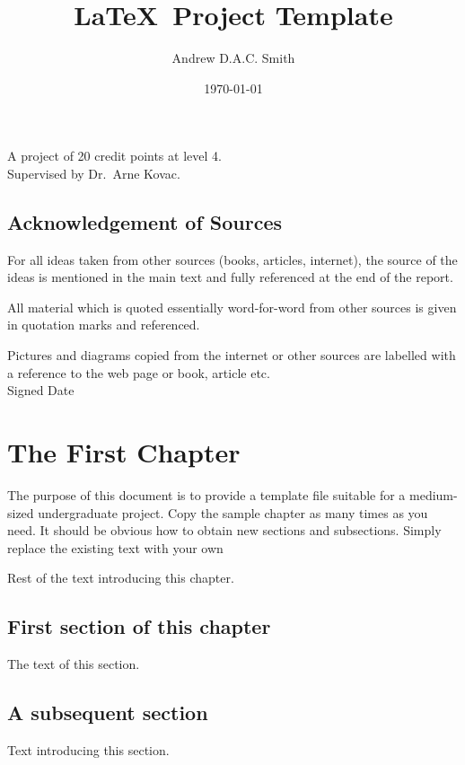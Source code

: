 \documentclass[a4paper, 12pt, notitlepage]{report}
\title{\LaTeX\ Project Template} %
\author{Andrew D.A.C. Smith} %
\date{\today} %
\begin{document}
\maketitle
\begin{center}
A project of 20 credit points at level 4. %
\\[12pt]
Supervised by Dr.\ Arne Kovac. %
\end{center}
\thispagestyle{empty}
\newpage
\section*{Acknowledgement of Sources} %
For all ideas taken from other sources (books, articles, internet), the source of the ideas is mentioned in the main text and fully referenced at the end of the report.

All material which is quoted essentially word-for-word from other sources is given in quotation marks and referenced.

Pictures and diagrams copied from the internet or other sources are labelled with a reference to the web page or book, article etc.
\\[12pt]
Signed \dotfill Date \dotfill

\tableofcontents 


\chapter{The First Chapter}
%
The purpose of this document is to provide a template file suitable for a medium-sized undergraduate project.
Copy the sample chapter as many times as you need.
It should be obvious how to obtain new sections and subsections.
Simply replace the existing text with your own 

Rest of the text introducing this chapter.

\section{First section of this chapter}
%
The text of this section.

\section{A subsequent section}
%
Text introducing this section.
\end{document}
